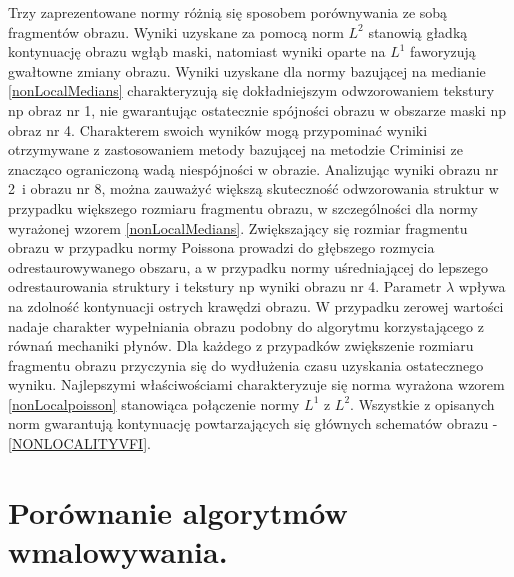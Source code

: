 \documentclass[a4paper,12pt,twoside,openany]{report}
\def \fullkotmyszm{obraz nr 1}
\def \fullObrIVm{obraz nr 4}
\def \maciekImu{obrazu nr 2}
\def \ObrIVmu{obrazu nr 4}
\def \ObrXVIImu{obrazu nr 8}
\begin{document}
Trzy zaprezentowane normy różnią się sposobem porównywania ze sobą fragmentów obrazu.
Wyniki uzyskane za pomocą norm $L^2$ stanowią gładką kontynuację obrazu wgłąb maski, natomiast wyniki oparte na $L^1$ faworyzują gwałtowne zmiany obrazu.
Wyniki uzyskane dla normy bazującej na medianie \eqref{nonLocalMedians} charakteryzują się dokładniejszym odwzorowaniem tekstury np \fullkotmyszm,  nie gwarantując ostatecznie spójności obrazu w obszarze maski np \fullObrIVm.
Charakterem swoich wyników mogą przypominać wyniki otrzymywane z zastosowaniem metody bazującej na metodzie Criminisi ze znacząco ograniczoną wadą niespójności w obrazie.
Analizując wyniki \maciekImu \ i \ObrXVIImu, można zauważyć większą skuteczność odwzorowania struktur w przypadku większego rozmiaru fragmentu obrazu, w szczególności dla normy wyrażonej wzorem \eqref{nonLocalMedians}.
Zwiększający się  rozmiar fragmentu obrazu w przypadku normy Poissona prowadzi do głębszego rozmycia odrestaurowywanego obszaru, a w przypadku normy uśredniającej do lepszego odrestaurowania struktury i tekstury np wyniki \ObrIVmu.
Parametr $\lambda$ wpływa na zdolność kontynuacji ostrych krawędzi obrazu.
W przypadku zerowej wartości nadaje charakter wypełniania obrazu podobny do algorytmu korzystającego z równań mechaniki płynów.
Dla każdego z przypadków zwiększenie rozmiaru fragmentu obrazu przyczynia się do wydłużenia czasu uzyskania ostatecznego wyniku.
Najlepszymi właściwościami charakteryzuje się norma wyrażona wzorem \eqref{nonLocalpoisson} stanowiąca połączenie normy $L^1$ z $L^2$.
Wszystkie z opisanych norm gwarantują kontynuację powtarzających się głównych schematów obrazu - \autoref{NONLOCALITYVFI}.
\section{Porównanie algorytmów wmalowywania.}
\end{document}
